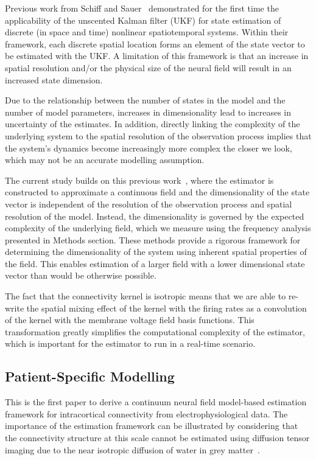 \documentclass[10pt]{article}
\begin{document}
Previous work from Schiff and Sauer~\cite{schiff2008kalman} demonstrated for the first time the applicability of the unscented Kalman filter (UKF) for state estimation of discrete (in space and time) nonlinear spatiotemporal systems. Within their framework, each discrete spatial location forms an element of the state vector to be estimated with the UKF. A limitation of this framework is that an increase in spatial resolution and/or the physical size of the neural field will result in an increased state dimension. 

Due to the relationship between the number of states in the model and the number of model parameters, increases in dimensionality lead to increases in uncertainty of the estimates. In addition, directly linking the complexity of the underlying system to the spatial resolution of the observation process implies that the system's dynamics become increasingly more complex the closer we look, which may not be an accurate modelling assumption.

The current study builds on this previous work~\cite{schiff2008kalman}, where the estimator is constructed to approximate a continuous field and the dimensionality of the state vector is independent of the resolution of the observation process and spatial resolution of the model. Instead, the dimensionality is governed by the expected complexity of the underlying field, which we measure using the frequency analysis presented in Methods section. These methods provide a rigorous framework for determining the dimensionality of the system using inherent spatial properties of the field. This enables estimation of a larger field with a lower dimensional state vector than would be otherwise possible. 

The fact that the connectivity kernel is isotropic means that we are able to re-write the spatial mixing effect of the kernel with the firing rates as a convolution of the kernel with the membrane voltage field basis functions. This transformation greatly simplifies the computational complexity of the estimator, which is important for the estimator to run in a real-time scenario.

\subsection*{Patient-Specific Modelling}
This is the first paper to derive a continuum neural field model-based estimation framework for intracortical connectivity from electrophysiological data. The importance of the estimation framework can be illustrated by considering that the connectivity structure at this scale cannot be estimated using diffusion tensor imaging due to the near isotropic diffusion of water in grey matter~\cite{Assaf2008}. 
\end{document}
